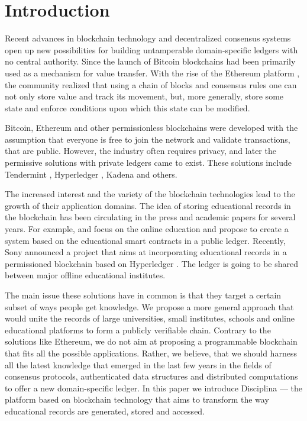 \section{Introduction}
Recent advances in blockchain technology and decentralized consensus systems open up new possibilities for building untamperable domain-specific ledgers with no central authority. Since the launch of Bitcoin \cite{nakamoto2008bitcoin} blockchains had been primarily used as a mechanism for value transfer. With the rise of the Ethereum platform \cite{wood2014ethereum}, the community realized that using a chain of blocks and consensus rules one can not only store value and track its movement, but, more generally, store some state and enforce conditions upon which this state can be modified.

Bitcoin, Ethereum and other permissionless blockchains were developed with the assumption that everyone is free to join the network and validate transactions, that are public. However, the industry often requires privacy, and later the permissive solutions with private ledgers came to exist. These solutions include Tendermint \cite{kwon2014tendermint}, Hyperledger \cite{cachin2016architecture}, Kadena \cite{Kadena} and others.

The increased interest and the variety of the blockchain technologies lead to the growth of their application domains. The idea of storing educational records in the blockchain has been circulating in the press and academic papers for several years. For example, \cite{swan2015blockchain} and \cite{devine2015blockchain} focus on the online education and propose to create a system based on the educational smart contracts in a public ledger. Recently, Sony announced a project that aims at incorporating educational records in a permissioned blockchain based on Hyperledger \cite{SGE}. The ledger is going to be shared between major offline educational institutes.

The main issue these solutions have in common is that they target a certain subset of ways people get knowledge. We propose a more general approach that would unite the records of large universities, small institutes, schools and online educational platforms to form a publicly verifiable chain. Contrary to the solutions like Ethereum, we do not aim at proposing a programmable blockchain that fits all the possible applications. Rather, we believe, that we should harness all the latest knowledge that emerged in the last few years in the fields of consensus protocols, authenticated data structures and distributed computations to offer a new domain-specific ledger. In this paper we introduce Disciplina — the platform based on blockchain technology that aims to transform the way educational records are generated, stored and accessed.
